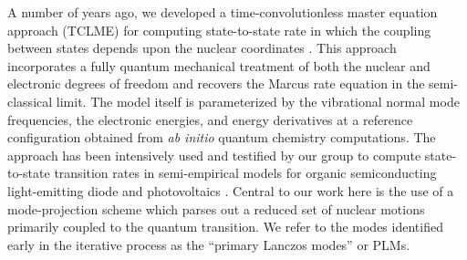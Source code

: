 A number of years ago,  we developed a time-convolutionless  master equation approach (TCLME) for computing
state-to-state rate in which the coupling between  states depends upon the
nuclear coordinates \cite{pereverzev2006time}. This approach incorporates a fully quantum
mechanical treatment of both the nuclear and electronic degrees of freedom and recovers
the Marcus rate equation in the semi-classical limit.  The model itself is parameterized by the
vibrational normal mode frequencies, the electronic energies, and energy derivatives
at a reference configuration obtained from {\em ab initio} quantum  chemistry computations.
The approach has been intensively used and testified by our group to compute state-to-state
transition rates in semi-empirical models for organic semiconducting light-emitting diode and photovoltaics
 \cite{tamura2008phonon,tamura2007exciton,singh2009fluorescence,bittner2014noise}.
Central to our work here is the use of a mode-projection scheme
 which parses out a
reduced set of nuclear motions primarily coupled to the quantum transition.
We refer to the modes identified early in the iterative process as the ``primary Lanczos modes'' or PLMs.

